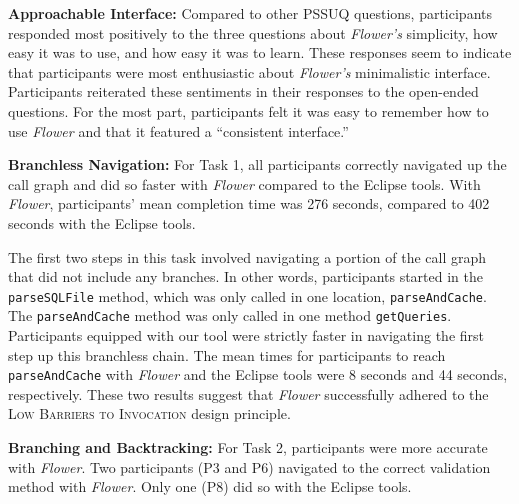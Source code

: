 \documentclass[conference]{IEEEtran}
\begin{document}

\textbf{Approachable Interface:}
Compared to other PSSUQ questions, participants responded most positively to the three questions about \textit{Flower's} simplicity, how easy it was to use, and how easy it was to learn. 
These responses seem to indicate that participants were most enthusiastic about \textit{Flower's} minimalistic interface. 
Participants reiterated these sentiments in their responses to the open-ended questions. 
For the most part, participants felt it was easy to remember how to use \textit{Flower} and that it featured a ``consistent interface.''

\textbf{Branchless Navigation:}
For Task 1, all participants correctly navigated up the call graph and did so faster with \textit{Flower} compared to the Eclipse tools.
With \textit{Flower}, participants' mean completion time was 276 seconds, compared to 402 seconds with the Eclipse tools.

The first two steps in this task involved navigating a portion of the call graph that did not include any branches.
In other words, participants started in the \texttt{parseSQLFile} method, which was only called in one location, \texttt{parseAndCache}. 
The \texttt{parseAndCache} method was only called in one method \texttt{getQueries}.
Participants equipped with our tool were strictly faster in navigating the first step up this branchless chain. 
The mean times for participants to reach \texttt{parseAndCache} with \textit{Flower} and the Eclipse tools were 8 seconds and 44 seconds, respectively.
These two results suggest that \textit{Flower} successfully adhered to the \textsc{Low Barriers to Invocation} design principle. 

\textbf{Branching and Backtracking:}
For Task 2, participants were more accurate with \textit{Flower}.
Two participants (P3 and P6) navigated to the correct validation method with \textit{Flower}.
Only one (P8) did so with the Eclipse tools.
\end{document}
